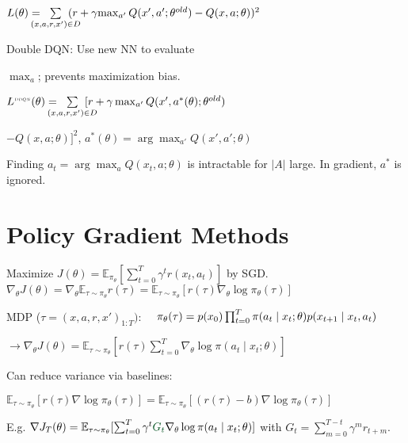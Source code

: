 {\fontsize{10}{6}\selectfont$L(\theta) = \hspace*{-4mm} \sum\limits_{(x,a,r,x') \in D} 
\hspace*{-4mm} (r + \gamma {\max_{a'} Q(x', a'; \theta^{old})} - 
Q(x,a;\theta))^2$}

{Double DQN}: Use new NN to evaluate

$\max_a$; prevents maximization bias.

$L^{{\scaleobj{.55}{ DDQN}}} (\theta) = \hspace*{-4mm} \sum\limits_{(x,a,r,x') \in D}
\hspace*{-4mm} [r + \gamma \max_{a'} Q(x', a^*(\theta); \theta^{old})$

$ - Q(x,a;\theta) ]^2$,
$a^*(\theta) = \arg\max_{a'} Q(x', a'; \theta)$

Finding $a_t = \arg\max_a Q(x_t,a;\theta)$ is intractable for ${|A|}$ large. In gradient, $a^*$ is ignored.


\section{Policy Gradient Methods} 
Maximize $J(\theta)=\mathbb{E}_{\pi_\theta} [\sum_{t=0}^{T} \gamma^t r(x_t,a_t)]$
 by SGD.\\
{\fontsize{10}{6}\selectfont$\nabla_\theta J(\theta)
 = \nabla_\theta \mathbb{E}_{\tau \sim \pi_\theta} r(\tau) 
 = \mathbb{E}_{\tau \sim \pi_\theta} [r(\tau) \nabla_\theta \log \pi_\theta(\tau)]$}

MDP ($\tau =(x,a,r,x')_{1:T})$: \ \ {$\pi_\theta(\tau) \\= p(x_0) \prod_{t=0}^{T} \pi(a_t \mid x_t; \theta) p(x_{t+1} \mid x_t, a_t)$}

{$\rightarrow\nabla_\theta J(\theta) = \mathbb{E}_{\tau \sim \pi_\theta} [r(\tau) \sum_{t=0}^{T} \nabla_\theta \log \pi(a_t \mid x_t; \theta)]$}

Can reduce variance via baselines:

\mbox{\fontsize{9}{6}\selectfont $\mathbb{E}_{\tau \sim \pi_\theta} 
[r(\tau) \nabla \log \pi_\theta(\tau)] = \mathbb{E}_{\tau \sim \pi_\theta}
 [{(r(\tau) - b)} \nabla \log \pi_\theta(\tau)]$}


E.g. {\fontsize{9}{6}\selectfont$\nabla J_T(\theta) = \mathbb{E}_{\tau \sim \pi_\theta} [\sum_{t=0}^T \gamma^t \textcolor{darkgreen}{G_t} \nabla_\theta \log \pi(a_t \mid x_t; \theta)]$}
with $G_t = \sum_{m= 0}^{T-t} \gamma^{m} r_{t+m}$.


